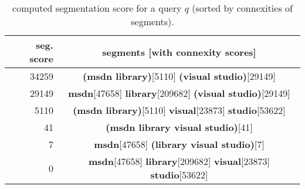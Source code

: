 \begin{table}[t]
 \caption{computed segmentation score for a query $q$ (sorted by connexities of segments).}
 \label{table-connexity-score-risvik-2003}
 \centering
 \small
 \begin{tabular}{@{}rc@{}}
  \toprule
  seg. score & segments [with connexity scores] \\
  \midrule
  34259      & \textbf{(msdn library)}[5110] \textbf{(visual studio)}[29149]  \\
  29149      & \textbf{msdn}[47658] \textbf{library}[209682] \textbf{(visual studio)}[29149]  \\
  5110       & \textbf{(msdn library)}[5110] \textbf{visual}[23873] \textbf{studio}[53622]  \\
  41      	 & \textbf{(msdn library visual studio)}[41]  \\
  7		     & \textbf{msdn}[47658] \textbf{(library visual studio)}[7]  \\
  0 		     & \textbf{msdn}[47658] \textbf{library}[209682] \textbf{visual}[23873] \textbf{studio}[53622]  \\
  \bottomrule
 \end{tabular}
\end{table}
